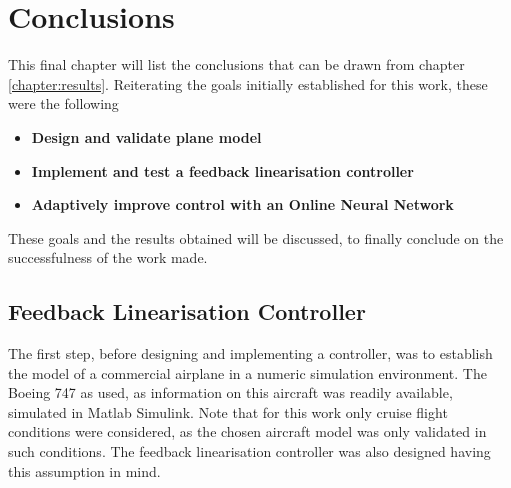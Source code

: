 
\chapter{Conclusions}
\label{chapter:conclusions}

This final chapter will list the conclusions that can be drawn from chapter \ref{chapter:results}. Reiterating the goals initially established for this work, these were the following

\begin{itemize}
\item \textbf{Design and validate plane model}
\item \textbf{Implement and test a feedback linearisation controller}
\item \textbf{Adaptively improve control with an Online Neural Network}
\end{itemize}

These goals and the results obtained will be discussed, to finally conclude on the successfulness of the work made. 

\section{Feedback Linearisation Controller}
\label{section:conclusions/fbl_controller}

The first step, before designing and implementing a controller, was to establish the model of a commercial airplane in a numeric simulation environment. The Boeing 747 as used, as information on this aircraft was readily available, simulated in Matlab Simulink. Note that for this work only cruise flight conditions were considered, as the chosen aircraft model was only validated in such conditions. The feedback linearisation controller was also designed having this assumption in mind. 

